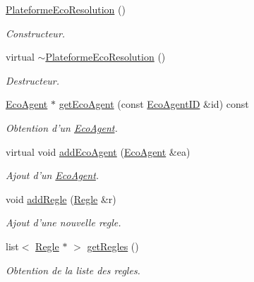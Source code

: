\begin{CompactItemize}
\item 
\hyperlink{classPlateformeEcoResolution_6e03cc2c6a51bc4a47d2d226e41d13e9}{PlateformeEcoResolution} ()
\begin{CompactList}\small\item\em Constructeur. \item\end{CompactList}\item 
virtual \hyperlink{classPlateformeEcoResolution_356b4862f53c4be870304e5186601b5a}{$\sim$PlateformeEcoResolution} ()
\begin{CompactList}\small\item\em Destructeur. \item\end{CompactList}\item 
\hyperlink{classEcoAgent}{EcoAgent} $\ast$ \hyperlink{classPlateformeEcoResolution_acd4e2899f178261ddd0fde086932e84}{getEcoAgent} (const \hyperlink{classEcoAgentID}{EcoAgentID} \&id) const 
\begin{CompactList}\small\item\em Obtention d'un \hyperlink{classEcoAgent}{EcoAgent}. \item\end{CompactList}\item 
virtual void \hyperlink{classPlateformeEcoResolution_6fdb4c8ecc62252da4326d9763d4f28d}{addEcoAgent} (\hyperlink{classEcoAgent}{EcoAgent} \&ea)
\begin{CompactList}\small\item\em Ajout d'un \hyperlink{classEcoAgent}{EcoAgent}. \item\end{CompactList}\item 
void \hyperlink{classPlateformeEcoResolution_c2978a0e31b186415ca156a19ac8a1dc}{addRegle} (\hyperlink{classRegle}{Regle} \&r)
\begin{CompactList}\small\item\em Ajout d'une nouvelle regle. \item\end{CompactList}\item 
list$<$ \hyperlink{classRegle}{Regle} $\ast$ $>$ \hyperlink{classPlateformeEcoResolution_81dad57670e80ac2d29d02918b610636}{getRegles} ()
\begin{CompactList}\small\item\em Obtention de la liste des regles. \item\end{CompactList}\item 

\end{CompactItemize}
